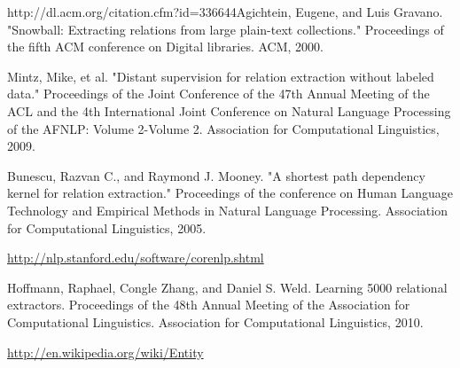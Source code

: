 \begin{thebibliography}{9}
 \label{snowball}
http://dl.acm.org/citation.cfm?id=336644Agichtein, Eugene, and Luis Gravano. "Snowball: Extracting relations from large plain-text collections." Proceedings of the fifth ACM conference on Digital libraries. ACM, 2000.
 
 \label{mintz}
Mintz, Mike, et al. "Distant supervision for relation extraction without labeled data." Proceedings of the Joint Conference of the 47th Annual Meeting of the ACL and the 4th International Joint Conference on Natural Language Processing of the AFNLP: Volume 2-Volume 2. Association for Computational Linguistics, 2009.
 
 \label{shortestpathdep}
Bunescu, Razvan C., and Raymond J. Mooney. "A shortest path dependency kernel for relation extraction." Proceedings of the conference on Human Language Technology and Empirical Methods in Natural Language Processing. Association for Computational Linguistics, 2005.
 
 \label{corenlp}
\url{http://nlp.stanford.edu/software/corenlp.shtml}
 
 \label{rel}
Hoffmann, Raphael, Congle Zhang, and Daniel S. Weld. Learning 5000 relational extractors. Proceedings of the 48th Annual Meeting of the Association for Computational Linguistics. Association for Computational Linguistics, 2010.

 \label{wikientity}
\url{http://en.wikipedia.org/wiki/Entity}

\end{thebibliography}
